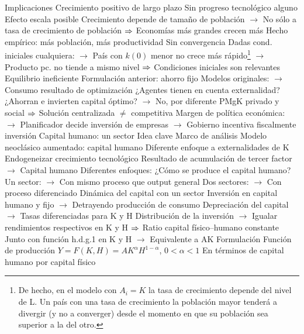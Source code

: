 \documentclass{nuevotema}
\begin{document}
\begin{esquemal}
			\3 Implicaciones
				\4 Crecimiento positivo de largo plazo
				\4[] Sin progreso tecnológico alguno
				\4 Efecto escala posible
				\4[] Crecimiento depende de tamaño de población
				\4[] $\to$ No sólo a tasa de crecimiento de población
				\4[] $\Rightarrow$ Economías más grandes crecen más
				\4[] Hecho empírico: más población, más productividad
				\4 Sin convergencia
				\4[] Dadas cond. iniciales cualquiera:
				\4[] $\to$ País con $k(0)$ menor no crece más rápido\footnote{De hecho, en el modelo con $A_i = K$ la tasa de crecimiento depende del nivel de L. Un país con una tasa de crecimiento la población mayor tenderá a divergir (y no a converger) desde el momento en que su población sea superior a la del otro.}
				\4[] $\to$ Producto pc. no tiende a mismo nivel
				\4[] $\Rightarrow$ Condiciones iniciales son relevantes
				\4 Equilibrio ineficiente
				\4[] Formulación anterior: ahorro fijo
				\4[] Modelos originales:
				\4[] $\to$ Consumo resultado de optimización
				\4[] ¿Agentes tienen en cuenta externalidad?
				\4[] ¿Ahorran e invierten capital óptimo?
				\4[] $\to$ No, por diferente PMgK privado y social
				\4[] $\Rightarrow$ Solución centralizada $\neq$ competitiva
				\4[] Margen de política económica:
				\4[] $\to$ Planificador decide inversión de empresas
				\4[] $\to$ Gobierno incentiva fiscalmente inversión
		\2 Capital humano: un sector
			\3 Idea clave
				\4 Marco de análisis
				\4[] Modelo neoclásico aumentado: capital humano
				\4 Diferente enfoque a externalidades de K
				\4[] Endogeneizar crecimiento tecnológico
				\4[] Resultado de acumulación de tercer factor
				\4[] $\to$ Capital humano
				\4 Diferentes enfoques:
				\4[] ¿Cómo se produce el capital humano?
				\4[] Un sector:
				\4[] $\to$ Con mismo proceso que output general
				\4[] Dos sectores:
				\4[] $\to$ Con proceso diferenciado
				\4 Dinámica del capital con un sector
				\4[] Inversión en capital humano y fijo
				\4[] $\to$ Detrayendo producción de consumo
				\4[] Depreciación del capital
				\4[] $\to$ Tasas diferenciadas para K y H
				\4[] Distribución de la inversión
				\4[] $\to$ Igualar rendimientos respectivos en K y H
				\4[] $\Rightarrow$ Ratio capital físico--humano constante
				\4[] Junto con función h.d.g.1 en K y H
				\4[] $\to$ Equivalente a AK
			\3 Formulación
				\4 Función de producción
				\4[] $Y = F(K,H) = AK^\alpha H^{1-\alpha}$, $0 < \alpha < 1$
				\4[] En términos de capital humano por capital físico

\end{esquemal}
\end{document}
